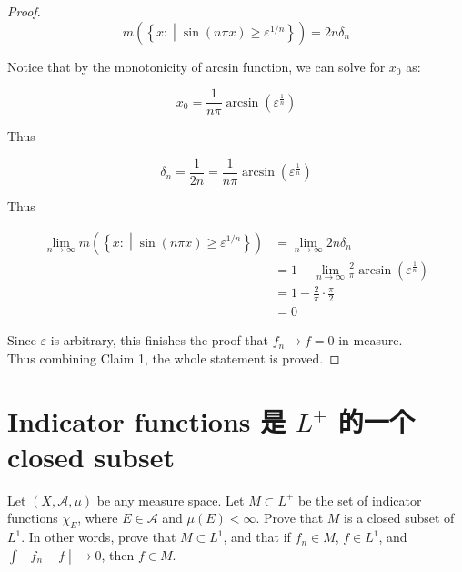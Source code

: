 \begin{proof}
\[m(\left\{ x: \middle| \sin(n\pi x) \geq \varepsilon^{1/n} \right\}) = 2n\delta_{n}\]

Notice that by the monotonicity of arcsin function, we can solve for \(x_{0}\) as:

\[x_{0} = \frac{1}{n\pi}\arcsin(\varepsilon^{\frac{1}{n}})\]

Thus

\[\delta_{n} = \frac{1}{2n} = \frac{1}{n\pi}\arcsin(\varepsilon^{\frac{1}{n}})\]

Thus

\[\begin{matrix}
{\lim\limits_{n\rightarrow\infty}m(\left\{ x: \middle| \sin(n\pi x) \geq \varepsilon^{1/n} \right\})} & {= \lim\limits_{n\rightarrow\infty}2n\delta_{n}} \\
 & {= 1 - \lim\limits_{n\rightarrow\infty}\frac{2}{\pi}\arcsin(\varepsilon^{\frac{1}{n}})} \\
 & {= 1 - \frac{2}{\pi} \cdot \frac{\pi}{2}} \\
 & {= 0}
\end{matrix}\]

Since \(\varepsilon\) is arbitrary, this finishes the proof that \(f_{n}\rightarrow f = 0\) in measure.\\
Thus combining Claim 1, the whole statement is proved.

\end{proof}

\section{\texorpdfstring{Indicator functions 是 \(L^{+}\) 的一个 closed subset}{Indicator functions 是 L\^{}\{+\} 的一个 closed subset}}\label{indicator-functions-ux662f-l-ux7684ux4e00ux4e2a-closed-subset}

Let \((X,\mathcal{A},\mu)\) be any measure space. Let \(M \subset L^{+}\) be the set of indicator functions \(\chi_{E}\), where \(E \in \mathcal{A}\) and \(\mu(E) < \infty\). Prove that \(M\) is a closed subset of \(L^{1}\). In other words, prove that \(M \subset L^{1}\), and that if \(f_{n} \in M\), \(f \in L^{1}\), and \(\left. \int \middle| f_{n} - f \middle| \rightarrow 0 \right.\), then \(f \in M\).

